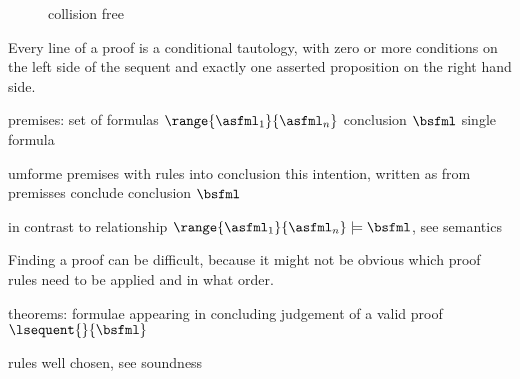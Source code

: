 \begin{figure}[t]
\begin{calculuscollections}{\textwidth}
\begin{calculus}
{                            
                        }{collision free}
                    \end{calculus}
                    \end{calculuscollections}
                \end{figure}

                Every line of a proof is a conditional tautology, with zero or more conditions on the left side of the sequent and exactly one asserted proposition on the right hand side.

                premises: set of formulas $\range{\asfml_1}{\asfml_n}$
                conclusion $\bsfml$ single formula

                umforme premises with rules into conclusion
                this intention, written as
                from premisses conclude conclusion $\bsfml$


                in contrast to relationship $\range{\asfml_1}{\asfml_n}\models\bsfml$, see semantics

                Finding a proof can be difficult, because it might not be obvious which proof rules need to be applied and in what order.

                theorems: formulae appearing in concluding judgement of a valid proof $\lsequent{}{\bsfml}$

                rules well chosen, see soundness


